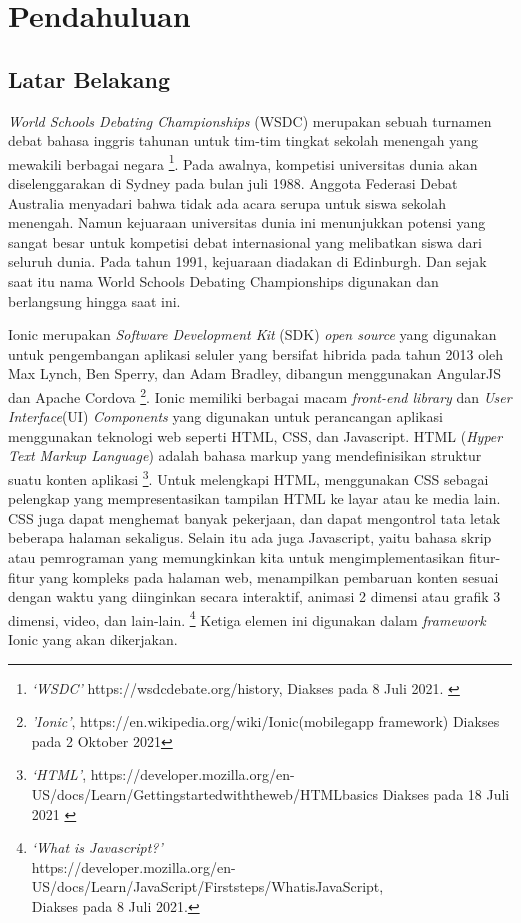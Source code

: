 \chapter{Pendahuluan}
\label{chap:intro}
   
\section{Latar Belakang}
\label{sec:label}

\textit{World Schools Debating Championships} (WSDC) merupakan sebuah turnamen debat bahasa inggris tahunan untuk tim-tim tingkat sekolah menengah yang mewakili berbagai negara \footnote{\textit{`WSDC'} https://wsdcdebate.org/history, Diakses pada 8 Juli 2021. \label{ref:wsdc}}. Pada awalnya, kompetisi universitas dunia akan diselenggarakan di Sydney pada bulan juli 1988. Anggota Federasi Debat Australia menyadari bahwa tidak ada acara serupa untuk siswa sekolah menengah. Namun kejuaraan universitas dunia ini menunjukkan potensi yang sangat besar untuk kompetisi debat internasional yang melibatkan siswa dari seluruh dunia. Pada tahun 1991, kejuaraan diadakan di Edinburgh. Dan sejak saat itu nama World Schools Debating Championships digunakan dan berlangsung hingga saat ini. 

Ionic merupakan {\it Software Development Kit} (SDK) {\it open source} yang digunakan untuk pengembangan aplikasi seluler yang bersifat hibrida pada tahun 2013 oleh Max Lynch, Ben Sperry, dan Adam Bradley, dibangun menggunakan AngularJS dan Apache Cordova \footnote{\textit{'Ionic'}, https://en.wikipedia.org/wiki/Ionic\textunderscore(mobileg\textunderscore app framework) Diakses pada 2 Oktober 2021}. Ionic memiliki berbagai macam \textit{front-end library} dan \textit{User Interface}(UI) {\it Components} yang digunakan untuk  perancangan aplikasi menggunakan teknologi web seperti HTML, CSS, dan Javascript. HTML (\textit{Hyper Text Markup Language}) adalah bahasa markup yang mendefinisikan struktur suatu konten aplikasi \footnote{\textit{`HTML'}, https://developer.mozilla.org/en-US/docs/Learn/Getting\textunderscore started\textunderscore with\textunderscore the\textunderscore web/HTML\textunderscore basics Diakses pada 18 Juli 2021 \label{ref:htmldefinition}}. Untuk melengkapi HTML, menggunakan CSS sebagai pelengkap yang mempresentasikan tampilan HTML ke layar atau ke media lain. CSS juga dapat menghemat banyak pekerjaan, dan dapat mengontrol tata letak beberapa halaman sekaligus. Selain itu ada juga Javascript, yaitu bahasa skrip atau pemrograman yang memungkinkan kita untuk mengimplementasikan fitur-fitur yang kompleks pada halaman web, menampilkan pembaruan konten sesuai dengan waktu yang diinginkan secara interaktif, animasi 2 dimensi atau grafik 3 dimensi, video, dan lain-lain. \footnote{\textit{`What is Javascript?'} \\ https://developer.mozilla.org/en-US/docs/Learn/JavaScript/First\textunderscore steps/What\textunderscore is\textunderscore JavaScript, \\ Diakses pada 8 Juli 2021.} Ketiga elemen ini digunakan dalam \textit{framework} Ionic yang akan dikerjakan.

